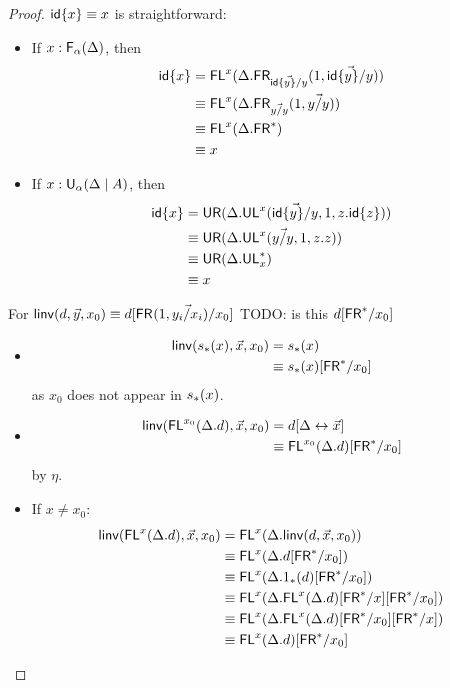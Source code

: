 \begin{proof}
${\mathsf{id}\{x\}} \equiv x$ is straightforward:
\begin{itemize}
\item If $x : \mathsf{F}_{\alpha}(\Delta)$, then
\begin{align*}
{\ensuremath{\mathsf{id}}\{x\}} 
&=\mathsf{FL}^{x}(\Delta.\mathsf{FR}_{\vec{{\mathsf{id}\{y\}}/y}}(1,\vec{{\mathsf{id}\{y\}}/y}))\\
&\equiv \mathsf{FL}^{x}(\Delta.\mathsf{FR}_{\vec{y/y}}(1,\vec{y/y}))\\
&\equiv \mathsf{FL}^{x}(\Delta.\mathsf{FR}^*)\\
&\equiv x
\end{align*}
\item If $x : \mathsf{U}_{\alpha}(\Delta \mid A)$, then
\begin{align*}
{\ensuremath{\mathsf{id}}\{x\}} 
&= \mathsf{UR}(\Delta.\mathsf{UL}^{x}_{}(\vec{{\mathsf{id}\{y\}}/y},1,z.{\mathsf{id}\{z\}}))\\
&\equiv \mathsf{UR}(\Delta.\mathsf{UL}^{x}_{}(\vec{y/y},1,z.z))\\
&\equiv \mathsf{UR}(\Delta.\mathsf{UL}^*_{x})\\
&\equiv x
\end{align*}
\end{itemize}
For $\mathsf{linv}(d,\vec{y},x_0) \equiv d[\mathsf{FR}_{}(1,\vec{y_i/x_i})/x_0]$
TODO: is this $d[\mathsf{FR}^*/x_0]$
\begin{itemize}
\item \begin{align*}
\mathsf{linv}(s_*(x),\vec{x},x_0) 
&= {s_*(x)} \\
&\equiv s_*(x)[\mathsf{FR}^*/x_0]
\end{align*}
as $x_0$ does not appear in $s_*(x)$.
\item \begin{align*}
\mathsf{linv}(\mathsf{FL}^{x_0}(\Delta.d),\vec{x},x_0) 
&= d[\Delta \leftrightarrow \vec{x}]\\
&\equiv \mathsf{FL}^{x_0}(\Delta.d)[\mathsf{FR}^*/x_0]
\end{align*}
by $\eta$.
\item If $x \neq x_0$: \begin{align*}
\Linv{\FLd{x}{\Delta.\D}}{\vec{x}}{x_0} 
&= \FLd{x}{\Delta.\Linv{\D}{\vec{x}}{x_0}} \\
&\deq \FLd{x}{\Delta.\Cut{\D}{\FRs}{x_0}} \\
&\deq \FLd{x}{\Delta.\Cut{\Trd{1}{\D}}{\FRs}{x_0}} \\
&\deq \FLd{x}{\Delta.\Cut{\Cut{\FLd{x}{\Delta.\D}}{\FRs}{x}}{\FRs}{x_0}} \\
&\deq \FLd{x}{\Delta.\Cut{\Cut{\FLd{x}{\Delta.\D}}{\FRs}{x_0}}{\FRs}{x}} \\
&\deq \Cut{\FLd{x}{\Delta.\D}}{\FRs}{x_0}

\end{align*}
\end{itemize}
\end{proof}
